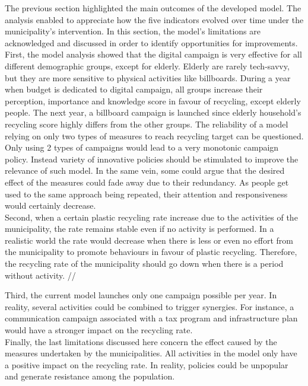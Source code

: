 \noindent The previous section highlighted the main outcomes of the developed model. The analysis enabled to appreciate how the five indicators evolved over time under the municipality's intervention. In this section, the model's limitations are acknowledged and discussed in order to identify opportunities for improvements. \\

\noindent First, the model analysis showed that the digital campaign is very effective for all different demographic groups, except for elderly. Elderly are rarely tech-savvy, but they are more sensitive to physical activities like billboards. During a year when budget is dedicated to digital campaign, all groups increase their perception, importance and knowledge score in favour of recycling, except elderly people. The next year, a billboard campaign is launched since elderly household's recycling score highly differs from the other groups. The reliability of a model relying on only two types of measures to reach recycling target can be questioned. Only using 2 types of campaigns would lead to a very monotonic campaign policy. Instead variety of innovative policies should be stimulated to improve the relevance of such model. In the same vein, some could argue that the desired effect of the measures could fade away due to their redundancy. As people get used to the same approach being repeated, their attention and responsiveness would certainly decrease. \\

\noindent Second, when a certain plastic recycling rate increase due to the activities of the municipality, the rate remains stable even if no activity is performed. In a realistic world the rate would decrease when there is less or even no effort from the municipality to promote behaviours in favour of plastic recycling. Therefore, the recycling rate of the municipality should go down when there is a period without activity. //

\noindent Third, the current model launches only one campaign possible per year. In reality, several activities could be combined to trigger synergies. For instance, a communication campaign associated with a tax program and infrastructure plan would have a stronger impact on the recycling rate. \\

\noindent Finally, the last limitations discussed here concern the effect caused by the measures undertaken by the municipalities. All activities in the model only have a positive impact on the recycling rate. In reality, policies could be unpopular and generate resistance among the population. \\

